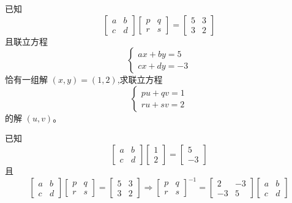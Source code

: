 \begin{questions}
    \question 已知
    \[
    \begin{bmatrix} a & b \\ c & d \end{bmatrix} 
    \begin{bmatrix} p & q \\ r & s \end{bmatrix} 
    = \begin{bmatrix} 5 & 3 \\ 3 & 2 \end{bmatrix}
    \]
    且联立方程
    \[
    \begin{cases} ax+by=5\\ cx+dy=-3 \end{cases}
    \]
    恰有一组解 $(x,y)=(1,2)$,求联立方程
    \[
    \begin{cases} pu+qv=1\\ ru+sv=2 \end{cases}
    \]
    的解 $(u,v)$。
    \begin{solution}
        已知
        \[
        \begin{bmatrix} a & b \\ c & d \end{bmatrix} \begin{bmatrix} 1 \\ 2 \end{bmatrix} = \begin{bmatrix} 5 \\ -3 \end{bmatrix} 
        \]
        且
        \[
        \begin{bmatrix} a & b \\ c & d \end{bmatrix} 
        \begin{bmatrix} p & q \\ r & s \end{bmatrix} 
        = \begin{bmatrix} 5 & 3 \\ 3 & 2 \end{bmatrix} 
        \Rightarrow 
        \begin{bmatrix} p & q \\ r & s \end{bmatrix}^{-1} = 
        \begin{bmatrix} 2 & -3 \\ -3 & 5 \end{bmatrix} 
        \begin{bmatrix} a & b \\ c & d \end{bmatrix}
\]
\end{solution}
\end{questions}
